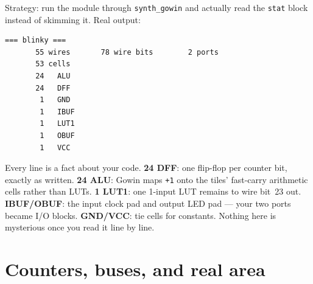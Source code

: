 \begin{example}
Strategy: run the module through \texttt{synth\_gowin} and actually read the
\texttt{stat} block instead of skimming it. Real output:

\begin{lstlisting}
=== blinky ===
       55 wires       78 wire bits        2 ports
       53 cells
       24   ALU
       24   DFF
        1   GND
        1   IBUF
        1   LUT1
        1   OBUF
        1   VCC
\end{lstlisting}

Every line is a fact about your code. \textbf{24 DFF}: one flip-flop per
counter bit, exactly as written. \textbf{24 ALU}: Gowin maps \texttt{+1} onto
the tiles' fast-carry arithmetic cells rather than LUTs. \textbf{1 LUT1}: one
1-input LUT remains to wire bit~23 out. \textbf{IBUF/OBUF}: the input clock pad
and output LED pad --- your two ports became I/O blocks. \textbf{GND/VCC}: tie
cells for constants. Nothing here is mysterious once you read it line by line.
\end{example}

\section{Counters, buses, and real area}

